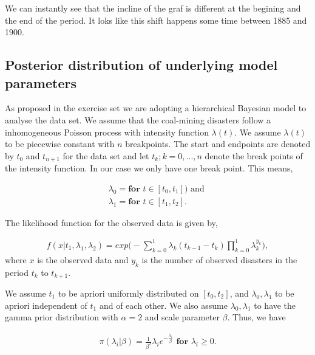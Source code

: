 We can instantly see that the incline of the graf is different at the begining and the end of the period. It loks like this shift happens some time between 1885 and 1900. 


\subsection{Posterior distribution of underlying model parameters} \label{posterior}

As proposed in the exercise set we are adopting a hierarchical Bayesian model to analyse the data set. We assume that the coal-mining disasters follow a inhomogeneous Poisson process with intensity function $\lambda(t)$. We assume $\lambda(t)$ to be piecewise constant with $n$ breakpoints. The start and endpoints are denoted by $t_0$ and $t_{n+1}$ for the data set and let $t_k; k = 0,...,n$ denote the break points of the intensity function. In our case we only have one break point. This means,  

\begin{align}
    \lambda_0 = \textbf{for } t \in [t_0,t_{1}]) \text{ and }\\
    \lambda_1 = \textbf{for } t \in [t_1, t_2].
\end{align}

The likelihood function for the observed data is given by,

\begin{align}
    f(x|t_1,\lambda_1,\lambda_2) 
    = exp \Big( - \sum_{k = 0}^1 \lambda_k (t_{k-1} - t_k) \prod_{k = 0}^1 \lambda_k^{y_k} \Big), 
\end{align}
where $x$ is the observed data and $y_k$ is the number of observed disasters in the period $t_k$ to $t_{k+1}$. 

We assume $t_1$ to be apriori uniformly distributed on $[t_0, t_2]$, and $\lambda_0, \lambda_1$ to be apriori independent of $t_1$ and of each other. We also assume $\lambda_0,\lambda_1$ to have the gamma prior distribution with $\alpha = 2$ and scale parameter $\beta$. Thus, we have 

\begin{align}
    \pi(\lambda_i | \beta) = \frac{1}{\beta^2}\lambda_i e^{-\frac{\lambda_i}{\beta}} \textbf{ for } \lambda_i \geq 0.
\end{align}

